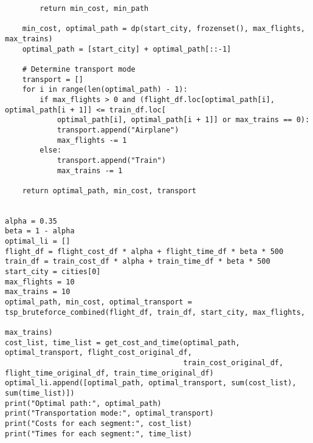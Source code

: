 \documentclass{article} %
\begin{document}
\begin{lstlisting}
        return min_cost, min_path

    min_cost, optimal_path = dp(start_city, frozenset(), max_flights, max_trains)
    optimal_path = [start_city] + optimal_path[::-1]

    # Determine transport mode
    transport = []
    for i in range(len(optimal_path) - 1):
        if max_flights > 0 and (flight_df.loc[optimal_path[i], optimal_path[i + 1]] <= train_df.loc[
            optimal_path[i], optimal_path[i + 1]] or max_trains == 0):
            transport.append("Airplane")
            max_flights -= 1
        else:
            transport.append("Train")
            max_trains -= 1

    return optimal_path, min_cost, transport


alpha = 0.35
beta = 1 - alpha
optimal_li = []
flight_df = flight_cost_df * alpha + flight_time_df * beta * 500
train_df = train_cost_df * alpha + train_time_df * beta * 500
start_city = cities[0]
max_flights = 10
max_trains = 10
optimal_path, min_cost, optimal_transport = tsp_bruteforce_combined(flight_df, train_df, start_city, max_flights,
                                                                    max_trains)
cost_list, time_list = get_cost_and_time(optimal_path, optimal_transport, flight_cost_original_df,
                                         train_cost_original_df, flight_time_original_df, train_time_original_df)
optimal_li.append([optimal_path, optimal_transport, sum(cost_list), sum(time_list)])
print("Optimal path:", optimal_path)
print("Transportation mode:", optimal_transport)
print("Costs for each segment:", cost_list)
print("Times for each segment:", time_list)
  \end{lstlisting}
\end{document}
